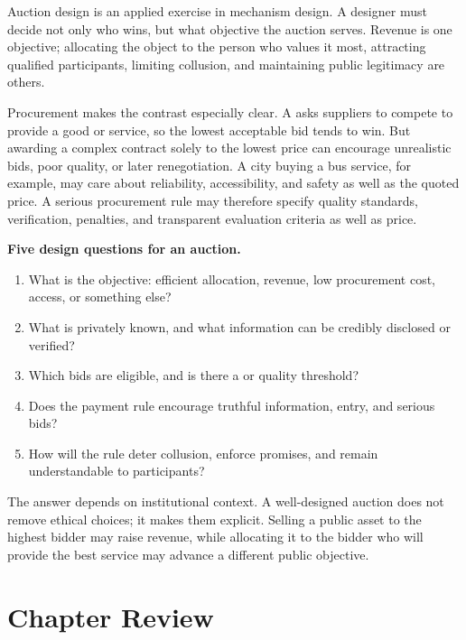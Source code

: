 Auction design is an applied exercise in mechanism design. A designer must
decide not only who wins, but what objective the auction serves. Revenue is
one objective; allocating the object to the person who values it most,
attracting qualified participants, limiting collusion, and maintaining public
legitimacy are others.

Procurement makes the contrast especially clear. A 
asks suppliers to compete to provide a good or service, so the lowest
acceptable bid tends to win. But awarding a complex contract solely to the
lowest price can encourage unrealistic bids, poor quality, or later
renegotiation. A city buying a bus service, for example, may care about
reliability, accessibility, and safety as well as the quoted price. A serious
procurement rule may therefore specify quality standards, verification,
penalties, and transparent evaluation criteria as well as price.

\begin{keyidea}
\textbf{Five design questions for an auction.}
\begin{enumerate}
  \item What is the objective: efficient allocation, revenue, low procurement cost, access, or something else?
  \item What is privately known, and what information can be credibly disclosed or verified?
  \item Which bids are eligible, and is there a  or quality threshold?
  \item Does the payment rule encourage truthful information, entry, and serious bids?
  \item How will the rule deter collusion, enforce promises, and remain understandable to participants?
\end{enumerate}
\end{keyidea}

The answer depends on institutional context. A well-designed auction does not
remove ethical choices; it makes them explicit. Selling a public asset to the
highest bidder may raise revenue, while allocating it to the bidder who will
provide the best service may advance a different public objective.

\section*{Chapter Review}

